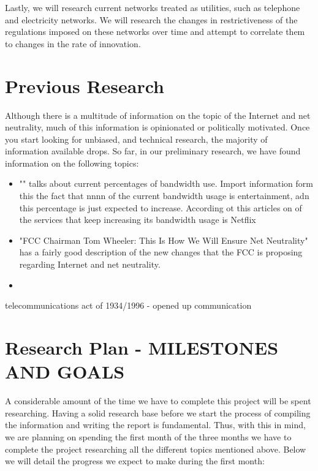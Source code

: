 \documentclass{sigcomm-alternate}
\begin{document}
Lastly, we will research current networks treated as utilities, such as telephone and electricity networks. We will research the changes in restrictiveness of the regulations imposed on these networks over time and attempt to correlate them to changes in the rate of innovation.


\section{Previous Research}
Although there is a multitude of information on the topic of the Internet and net neutrality, much of this information is opinionated or politically motivated. Once you start looking for unbiased, and technical research, the majority of information available drops. So far, in our preliminary research, we have found information on the following topics: 

\begin{itemize}
	\item "" talks about current percentages of bandwidth use. Import information form this the fact that nnnn of the current bandwidth usage is entertainment, adn this percentage is just expected to increase. According ot this articles on of the services that keep increasing its bandwidth usage is Netflix
	\item "FCC Chairman Tom Wheeler: This Is How We Will Ensure Net Neutrality" has a fairly good description of the new changes that the FCC is proposing regarding Internet and net neutrality.
	\item 
\end{itemize}


telecommunications act of 1934/1996 - opened up communication

\cite{FCCTomWheeler}
\cite{1224454}
\cite{1631969}
\cite{5188801}
\cite{5277804}


\section{Research Plan - MILESTONES AND GOALS}


A considerable amount of the time we have to complete this project will be spent researching. Having a solid research base before we start the process of compiling the information and writing the report is fundamental. Thus, with this in mind, we are planning on spending the first month of the three months we have to complete the project researching all the different topics mentioned above. Below we will detail the progress we expect to make during the first month:
\end{document}

